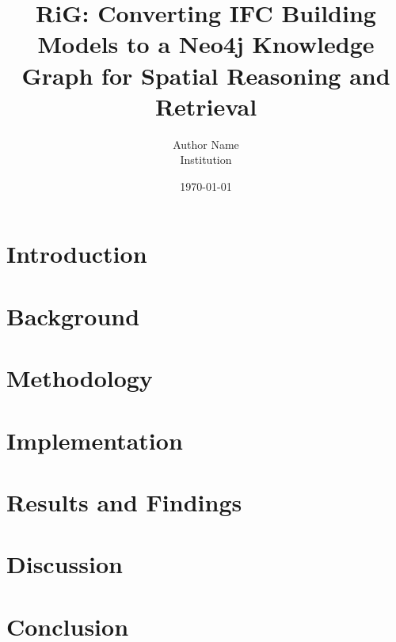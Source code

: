 \documentclass[11pt]{article}
\title{RiG: Converting IFC Building Models to a Neo4j Knowledge Graph for Spatial Reasoning and Retrieval}
\author{Author Name\\Institution}
\date{\today}
\begin{document}
\maketitle

\begin{abstract}

\end{abstract}

\section{Introduction}


\section{Background}


\section{Methodology}


\section{Implementation}


\section{Results and Findings}


\section{Discussion}


\section{Conclusion}




\end{document}
